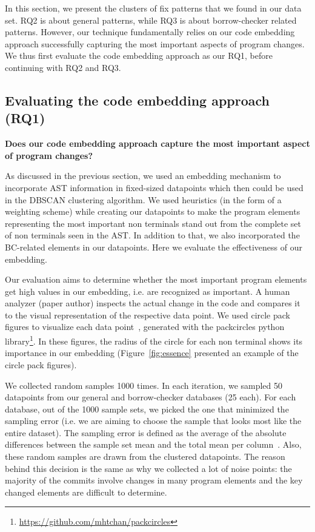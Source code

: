 In this section, we present the clusters of fix patterns that we found in our data set. RQ2 is about general patterns, while RQ3 is about borrow-checker related patterns. However, our technique fundamentally relies on our code embedding approach successfully capturing the most important aspects of program changes. We thus first evaluate the code embedding approach as our RQ1, before continuing with RQ2 and RQ3.

\subsection{Evaluating the code embedding approach (RQ1)}

\textbf{Does our code embedding approach capture the most important aspect of program changes?} 


As discussed in the previous section, we used an embedding mechanism to incorporate AST information in fixed-sized datapoints which then could be used in the DBSCAN clustering algorithm. We used heuristics (in the form of a weighting scheme) while creating our datapoints to make the program elements representing the most important non terminals stand out from the complete set of non terminals seen in the AST. In addition to that, we also incorporated the BC-related elements in our datapoints. Here we evaluate the effectiveness of our embedding.

Our evaluation aims to determine whether the most important program elements get high values in our embedding, i.e. are recognized as important. A human analyzer (paper author) inspects the actual change in the code and compares it to the visual representation of the respective data point. We used circle pack figures to visualize each data point~\citep{collins2003circle}, generated with the packcircles python library\footnote{\url{https://github.com/mhtchan/packcircles}}. In these figures, the radius of the circle for each non terminal shows its importance in our embedding (Figure~\ref{fig:essence} presented an example of the circle pack figures).

We collected random samples 1000 times. In each iteration, we sampled 50 datapoints from our general and borrow-checker databases (25 each). For each database, out of the 1000 sample sets, we picked the one that minimized the sampling error (i.e. we are aiming to choose the sample that looks most like the entire dataset). The sampling error is defined as the average of the absolute differences between the sample set mean and the total mean per column~\citep{degroot2012probability}. Also, these random samples are drawn from the clustered datapoints. The reason behind this decision is the same as why we collected a lot of noise points: the majority of the commits involve changes in many program elements and the key changed elements are difficult to determine.

